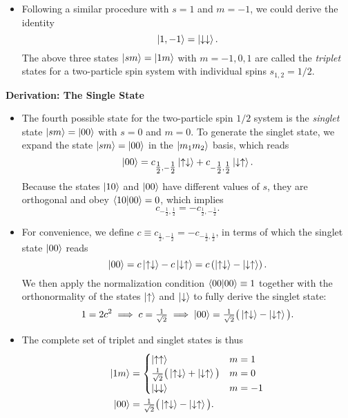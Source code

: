 \documentclass[11pt, a4paper]{article}
\newcommand{\ua}{\uparrow}  %
\newcommand{\da}{\downarrow}  %
\begin{document}
\begin{itemize}
    \item Following a similar procedure with $ s = 1 $ and $ m = -1 $, we could derive the identity
    \begin{equation*}
        \ket{1, -1} = \ket{\da\da}.
    \end{equation*}
    The above three states $ \ket{sm} = \ket{1m} $ with $ m = -1, 0, 1 $ are called the \textit{triplet} states for a two-particle spin system with individual spins $ s_{1,2} = 1/2 $.

\end{itemize}

\textbf{Derivation: The Single State}
\begin{itemize}
    \item The fourth possible state for the two-particle spin $ 1/2 $ system is the \textit{singlet} state $ \ket{sm} = \ket{00} $ with $ s = 0 $ and $ m = 0 $. To generate the singlet state, we expand the state $ \ket{sm} = \ket{00} $ in the $ \ket{m_{1}m_{2}} $ basis, which reads
    \begin{equation*}
        \ket{00} = c_{\tfrac{1}{2},-\tfrac{1}{2}} \ket{\ua\da} + c_{-\tfrac{1}{2}, \tfrac{1}{2}}\ket{\da \ua}.
    \end{equation*}
    Because the states $ \ket{10} $ and $ \ket{00} $ have different values of $ s $, they are orthogonal and obey $ \braket{10}{00} = 0 $, which implies
    \begin{equation*}
        c_{-\tfrac{1}{2}, \tfrac{1}{2}} = - c_{\tfrac{1}{2}, -\tfrac{1}{2}}.
    \end{equation*}

    \item For convenience, we define $ c \equiv c_{\tfrac{1}{2}, -\tfrac{1}{2}} = - c_{-\tfrac{1}{2}, \tfrac{1}{2}} $, in terms of which the singlet state $ \ket{00} $ reads
    \begin{equation*}
        \ket{00} = c \ket{\ua \da} - c \ket{\da \ua} = c \left( \ket{\ua \da} - \ket{\da \ua}\right).
    \end{equation*}
    We then apply the normalization condition $ \braket{00}{00} \equiv 1 $ together with the orthonormality of the states $ \ket{\ua} $ and $ \ket{\da} $ to fully derive the singlet state:
    \begin{equation*}
        1 = 2c^{2} \implies c = \tfrac{1}{\sqrt{2}} \implies \ket{00} = \tfrac{1}{\sqrt{2}} \big( \ket{\ua\da} - \ket{\da \ua} \big).
    \end{equation*}
    
    \item The complete set of triplet and singlet states is thus
    \begin{align*}
        \ket{1m} &= 
        \begin{cases}
            \ket{\ua\ua} & m = 1\\
            \tfrac{1}{\sqrt{2}} \big( \ket{\ua\da} + \ket{\da\ua} \big) & m = 0\\
            \ket{\da\da} & m = -1
        \end{cases}\\
        \ket{00} &= \tfrac{1}{\sqrt{2}} \big( \ket{\ua\da} - \ket{\da \ua} \big).
    \end{align*}
   

\end{itemize}
\end{document}
